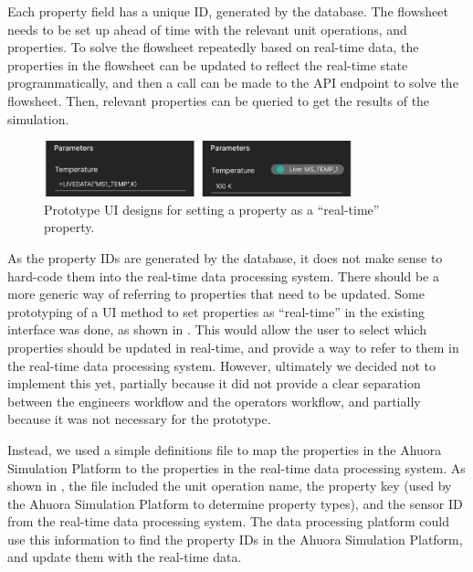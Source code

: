 Each property field has a unique ID, generated by the database. The flowsheet needs to be set up ahead of time with the relevant unit operations, and properties. To solve the flowsheet repeatedly based on real-time data, the properties in the flowsheet can be updated to reflect the real-time state programmatically, and then a call can be made to the API endpoint to solve the flowsheet. Then, relevant properties can be queried to get the results of the simulation.

\begin{figure}
    \centering
    \includegraphics[width=0.8\textwidth]{property_ui.png}
    \caption{Prototype UI designs for setting a property as a ``real-time'' property.}
    \label{fig:property-ui}
\end{figure}

As the property IDs are generated by the database, it does not make sense to hard-code them into the real-time data processing system. There should be a more generic way of referring to properties that need to be updated. 
Some prototyping of a UI method to set properties as ``real-time'' in the existing interface was done, as shown in . 
This would allow the user to select which properties should be updated in real-time, and provide a way to refer to them in the real-time data processing system. 
However, ultimately we decided not to implement this yet, partially because it did not provide a clear separation between the engineers workflow and the operators workflow, and partially because it was not necessary for the prototype.

Instead, we used a simple definitions file to map the properties in the Ahuora Simulation Platform to the properties in the real-time data processing system. 
As shown in , the file included the unit operation name, the property key (used by the Ahuora Simulation Platform to determine property types), and the sensor ID from the real-time data processing system. 
The data processing platform could use this information to find the property IDs in the Ahuora Simulation Platform, and update them with the real-time data.

